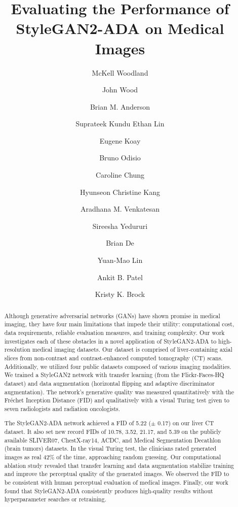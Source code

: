 \documentclass[runningheads]{llncs}
\begin{document}
\title{Evaluating the Performance of StyleGAN2-ADA on Medical Images}



\author{
McKell Woodland\and John Wood \and
Brian M. Anderson \and Suprateek Kundu
Ethan Lin \and
Eugene Koay \and
Bruno Odisio \and
Caroline Chung \and
Hyunseon Christine Kang \and Aradhana M. Venkatesan \and
Sireesha Yedururi \and
Brian De \and Yuan-Mao Lin \and Ankit B. Patel \and
Kristy K. Brock }



\maketitle              

\begin{abstract}
Although generative adversarial networks (GANs) have shown promise in medical imaging, they have four main limitations that impede their utility: computational cost, data requirements, reliable evaluation measures, and training complexity.
Our work investigates each of these obstacles in a novel application of StyleGAN2-ADA to high-resolution medical imaging datasets.
Our dataset is comprised of liver-containing axial slices from non-contrast and contrast-enhanced computed tomography (CT) scans.
Additionally, we utilized four public datasets composed of various imaging modalities.
We trained a StyleGAN2 network with transfer learning (from the Flickr-Faces-HQ dataset) and data augmentation (horizontal flipping and adaptive discriminator augmentation).
The network’s generative quality was measured quantitatively with the Fr\'{e}chet Inception Distance (FID) and qualitatively with a visual Turing test given to seven radiologists and radiation oncologists. 

The StyleGAN2-ADA network achieved a FID of 5.22 ($\pm$ 0.17) on our liver CT dataset.
It also set new record FIDs of 10.78, 3.52, 21.17, and 5.39 on the publicly available SLIVER07, ChestX-ray14, ACDC, and Medical Segmentation Decathlon (brain tumors) datasets.
In the visual Turing test, the clinicians rated generated images as real 42\% of the time, approaching random guessing. 
Our computational ablation study revealed that transfer learning and data augmentation stabilize training and improve the perceptual quality of the generated images.
We observed the FID to be consistent with human perceptual evaluation of medical images.
Finally, our work found that StyleGAN2-ADA consistently produces high-quality results without hyperparameter searches or retraining.


\end{abstract}
\end{document}

